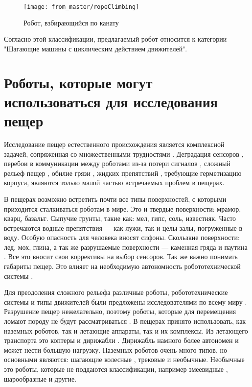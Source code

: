 \begin{figure}[H]
\centering\texttt{[image: from\_master/ropeClimbing]}
\caption{Робот, взбирающийся по канату}
\label{fig:ropeClimbing}
\end{figure}

Согласно этой классификации, предлагаемый робот относится к категории "Шагающие машины с циклическим действием движителей".

\section{Роботы, которые могут использоваться для исследования пещер}

Исследование пещер естественного происхождения является комплексной задачей, сопряженная со множественными трудностями \cite{Zhang2017a, Frumkin2019}. Деградация сенсоров \cite{Huang2019}, перебои в коммуникации между роботами из-за потери сигналов \cite{Vaquero2018, Thangavelautham2017}, сложный рельеф пещер \cite{Thangavelautham2017}, обилие грязи \cite{Baker2004}, жидких препятствий \cite{Morris2006}, требующие герметизацию корпуса, являются только малой частью встречаемых проблем в пещерах. 

В пещерах возможно встретить почти все типы поверхностей, с которыми приходится сталкиваться роботам в мире. Это и твердые поверхности: мрамор, кварц, базальт. Сыпучие грунты, такие как: мел, гипс, соль, известняк. Часто встречаются водные препятствия — как лужи, так и целы залы, погруженные в воду. Особую опасность для человека вносят сифоны. Скользкие поверхности: лед, мох, глина, а так же разрушаемые поверхности — каменная гряда и паутина \cite{1960,1963,1969,1971}. Все это вносит свои коррективы на выбор сенсоров. Так же важно понимать габариты пещер. Это влияет на необходимую автономность робототехнической системы \cite{Mascarich2018a}. 

Для преодоления сложного рельефа различные роботы, робототехнические системы и типы движителей были предложены исследователями по всему миру \cite{Morris2006a}. Разрушение пещер нежелательно, поэтому роботы, которые для перемещения ломают породу не будут рассматриваться \cite{Semini2016}. В пещерах принято использовать, как наземных роботов, так и летающие аппараты, так и их комплексы. Из летающего транспорта это коптеры \cite{Papachristos2019,Scaramuzza2014,Zingg2010} и дирижабли \cite{Huang2019}. Дирижабль намного более автономен и может нести большую нагрузку. Наземных роботов очень много типов, но основными являются: шагающие \cite{Tan2016,Lynch2019} колесные \cite{Molyneaux2016,Vaquero2018}, трековые \cite{Reddy2015} и необычные. Необычные это роботы, которые не поддаются классификации, например змеевидные \cite{Ye2007,Borenstein2007}, шарообразные \cite{Thangavelautham2017,Dubowsky2008,Dang2019} и другие.

